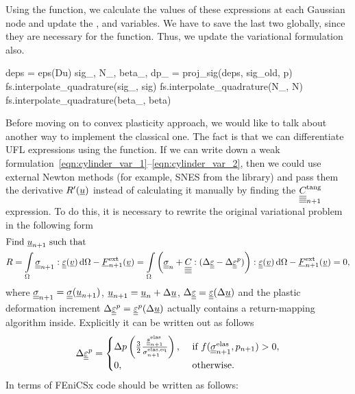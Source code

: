 \documentclass[12pt]{article}
\begin{document}
Using the  function, we calculate the values of these expressions at each Gaussian node and update the ,  and  variables. We have to save the last two globally, since they are necessary for the  function. Thus, we update the variational formulation also.
\begin{pythoncode}
    deps = eps(Du)
    sig_, N_, beta_, dp_ = proj_sig(deps, sig_old, p)
    fs.interpolate_quadrature(sig_, sig)
    fs.interpolate_quadrature(N_, N)
    fs.interpolate_quadrature(beta_, beta)
\end{pythoncode}

Before moving on to convex plasticity approach, we would like to talk about another way to implement the classical one. The fact is that we can differentiate UFL expressions using the  function. If we can write down a weak formulation~\eqref{eqn:cylinder_var_1}--\eqref{eqn:cylinder_var_2}, then we could use external Newton methods (for example, SNES from the  library) and pass them the derivative $R^\prime(\underline{u})$ instead of calculating it manually by finding the $\underline{\underline{\underline{\underline{C_{}}}}}_{n+1}^\text{tang}$ expression. To do this, it is necessary to rewrite the original variational problem in the following form
\begin{align}
    & \text{Find } \underline{u}_{n+1} \text{ such that} \label{eqn:cylinder_SNES_var_1} \\
    & R = \int\limits_\Omega \underline{\underline{\sigma}}_{n+1} : \underline{\underline{\varepsilon}}(\underline{v}) \, \mathrm{d}\Omega - \underline{F}_{n+1}^\text{ext}(\underline{v}) = \int\limits_\Omega \left( \underline{\underline{\sigma}}_n + \underline{\underline{\underline{\underline{C_{}}}}} : (\Delta\underline{\underline{\varepsilon}} - \Delta\underline{\underline{\varepsilon}}^p) \right) : \underline{\underline{\varepsilon}}(\underline{v}) \, \mathrm{d}\Omega - \underline{F}_{n+1}^\text{ext}(\underline{v}) = 0, \label{eqn:cylinder_SNES_var_2}
\end{align}
where $\underline{\underline{\sigma}}_{n+1} = \underline{\underline{\sigma}}(\underline{u}_{n+1})$, $\underline{u}_{n+1} = \underline{u}_{n} + \Delta\underline{u}$, $\Delta\underline{\underline{\varepsilon}} = \underline{\underline{\varepsilon}}(\Delta\underline{u})$ and the plastic deformation increment $\Delta\underline{\underline{\varepsilon}}^p = \underline{\underline{\varepsilon}}^p(\Delta\underline{u})$ actually contains a return-mapping algorithm inside. Explicitly it can be written out as follows
\begin{equation}
    \Delta\underline{\underline{\varepsilon}}^p = 
        \begin{cases}
            \Delta p \left( \frac{3}{2}\frac{\underline{\underline{s}}_{n+1}^\text{elas}} {\sigma_{n+1}^\text{elas,eq}} \right), & \text{ if } f(\underline{\underline{\sigma}}_{n+1}^{\text{elas}}, p_{n+1}) > 0,  \\
            0, & \text{ otherwise}.
        \end{cases}
\end{equation}
In terms of FEniCSx code should be written as follows:
\end{document}
